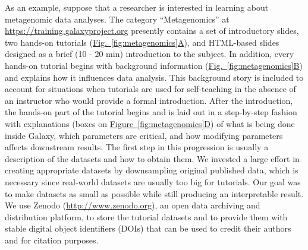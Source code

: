 As an example, suppose that a researcher is interested in learning about metagenomic data analyses. The category “Metagenomics” at  \url{https://training.galaxyproject.org} presently contains a set of introductory slides, two hands-on tutorials (\hyperref[fig:metagenomics]{Fig.~\ref{fig:metagenomics}A}), and HTML-based slides designed as a brief (10 - 20 min) introduction to the subject. In addition, every hands-on tutorial begins with background information (\hyperref[fig:metagenomics]{Fig.~\ref{fig:metagenomics}B}) and explains how it influences data analysis. This background story is included to account for situations when tutorials are used for self-teaching in the absence of an instructor who would provide a formal introduction. After the introduction, the hands-on part of the tutorial begins and is laid out in a step-by-step fashion with explanations (boxes on \hyperref[fig:metagenomics]{Figure~\ref{fig:metagenomics}D}) of what is being done inside Galaxy, which parameters are critical, and how modifying parameters affects downstream results. The first step in this progression is usually a description of the datasets and how to obtain them. We invested a large effort in creating appropriate datasets by downsampling original published data, which is necessary since real-world datasets are usually too big for tutorials. Our goal was to make datasets as small as possible while still producing an interpretable result. We use Zenodo (\url{http://www.zenodo.org}), an open data archiving and distribution platform, to store the tutorial datasets and to provide them with stable digital object identifiers (DOIs) that can be used to credit their authors and for citation purposes.


